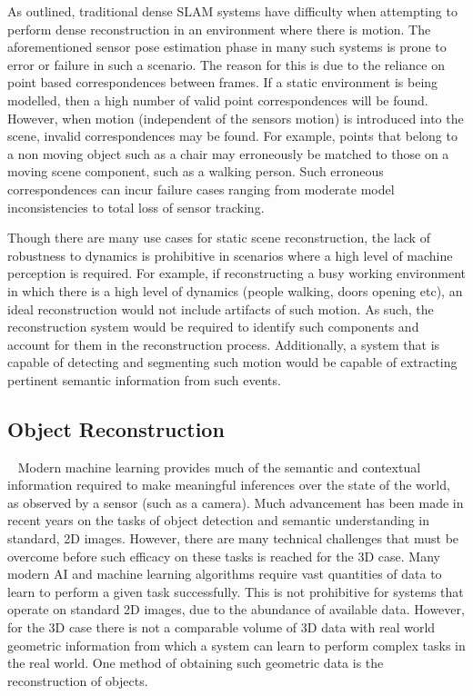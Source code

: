 
As outlined, traditional dense SLAM systems have difficulty when attempting to perform dense reconstruction 
in an environment where there is motion. The aforementioned sensor pose estimation phase in many such systems
is prone to error or failure in such a scenario. The reason for this is due to the reliance on point based 
correspondences between frames. If a static environment is being modelled, then a high number of valid point 
correspondences will be found. However, when motion (independent of the sensors motion) is introduced into 
the scene, invalid correspondences may be found. For example, points that belong to a non moving object 
such as a chair may erroneously be matched to those on a moving scene component, such as a walking person.
Such erroneous correspondences can incur failure cases ranging from moderate model inconsistencies to total 
loss of sensor tracking.

Though there are many use cases for static scene reconstruction, the lack of robustness to dynamics is 
prohibitive in scenarios where a high level of machine perception is required. For example, if 
reconstructing a busy working environment in which there is a high level of dynamics (people walking, 
doors opening etc), an ideal reconstruction would not include artifacts of such motion. As such, the 
reconstruction system would be required to identify such components and account for them in the 
reconstruction process. Additionally, a system that is capable of detecting and segmenting such motion 
would be capable of extracting pertinent semantic information from such events.

\subsection{Object Reconstruction}
~\label{subsec:intro_object_recon}
Modern machine learning provides much of the semantic and contextual information required to make meaningful 
inferences over the state of the world, as observed by a sensor (such as a camera). Much advancement 
has been made in recent years on the tasks of object detection and semantic understanding in standard, 
2D images. However, there are many technical challenges that must be overcome before such efficacy on these 
tasks is reached for the 3D case. Many modern AI and machine learning algorithms require vast quantities of 
data to learn to perform a given task successfully. This is not prohibitive for systems that operate on standard 
2D images, due to the abundance of available data. However, for the 3D case there is not a comparable volume of 
3D data with real world geometric information from which a system can learn to perform complex tasks in the real 
world. One method of obtaining such geometric data is the reconstruction of objects.

